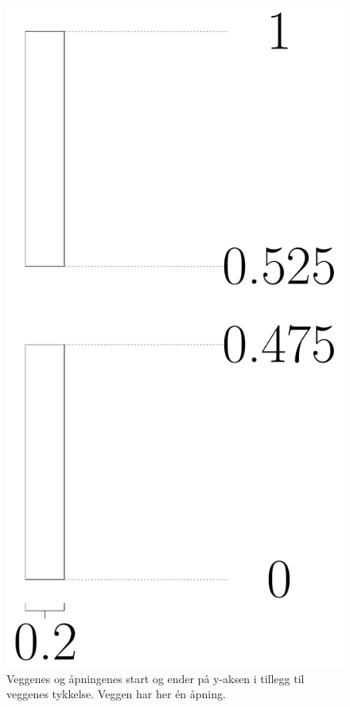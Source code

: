\documentclass[reprint,english,notitlepage]{revtex4-2}  %
\begin{document}
\begin{figure}[H]
	\centering 
	\includegraphics[scale=0.1]{../Images/1Walls.pdf}
	\caption{Veggenes og åpningenes start og ender på y-aksen i tillegg til veggenes tykkelse. Veggen har her én åpning.}
	\label{fig:Wall1}
\end{figure}
\end{document}
